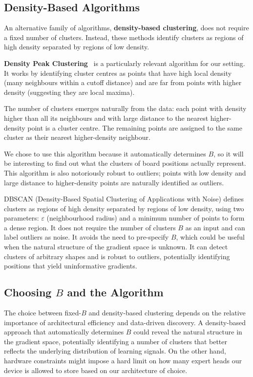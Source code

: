 \subsection{Density-Based Algorithms}\label{sec:density-cluster}

An alternative family of algorithms, \textbf{density-based clustering}, does not require a fixed number of clusters. Instead, these methods identify clusters as regions of high density separated by regions of low density.

\textbf{Density Peak Clustering}~\cite{rodriguez2014density} is a particularly relevant algorithm for our setting. It works by identifying cluster centres as points that have high local density (many neighbours within a cutoff distance) and are far from points with higher density (suggesting they are local maxima).

The number of clusters emerges naturally from the data: each point with density higher than all its neighbours and with large distance to the nearest higher-density point is a cluster centre. The remaining points are assigned to the same cluster as their nearest higher-density neighbour.

We chose to use this algorithm because it automatically determines \(B\), so it will be interesting to find out what the clusters of board positions actually represent. This algorithm is also notoriously robust to outliers; points with low density and large distance to higher-density points are naturally identified as outliers.

DBSCAN (Density-Based Spatial Clustering of Applications with Noise) defines clusters as regions of high density separated by regions of low density, using two parameters: \(\varepsilon\) (neighbourhood radius) and a minimum number of points to form a dense region. It does not require the number of clusters \(B\) as an input and can label outliers as noise. It avoids the need to pre-specify \(B\), which could be useful when the natural structure of the gradient space is unknown. It can detect clusters of arbitrary shapes and is robust to outliers, potentially identifying positions that yield uninformative gradients.

\subsection{Choosing \texorpdfstring{\(B\)}{B} and the Algorithm}\label{sec:choose-b}

The choice between fixed-\(B\) and density-based clustering depends on the relative importance of architectural efficiency and data-driven discovery. A density-based approach that automatically determines \(B\) could reveal the natural structure in the gradient space, potentially identifying a number of clusters that better reflects the underlying distribution of learning signals. On the other hand, hardware constraints might impose a hard limit on how many expert heads our device is allowed to store based on our architecture of choice.

